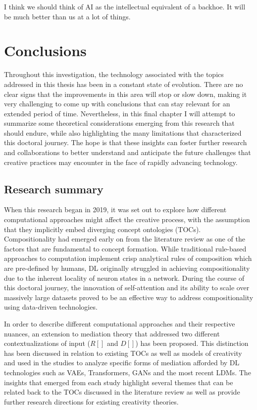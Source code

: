 \begin{savequote}[75mm]
	I think we should think of AI as the intellectual equivalent of a backhoe. It will be much better than us at a lot of things.
\end{savequote}

\chapter{Conclusions}
 Throughout this investigation, the technology associated with the topics addressed in this thesis has been in a constant state of evolution. There are no clear signs that the improvements in this area will stop or slow down, making it very challenging to come up with conclusions that can stay relevant for an extended period of time. Nevertheless, in this final chapter I will attempt to summarize some theoretical considerations emerging from this research that should endure, while also highlighting the many limitations that characterized this doctoral journey. The hope is that these insights can foster further research and collaborations to better understand and anticipate the future challenges that creative practices may encounter in the face of rapidly advancing technology.

\section{Research summary}
 When this research began in 2019, it was set out to explore how different computational approaches might affect the creative process, with the assumption that they implicitly embed diverging concept ontologies (TOCs). Compositionality had emerged early on from the literature review as one of the factors that are fundamental to concept formation. While traditional rule-based approaches to computation implement crisp analytical rules of composition which are pre-defined by humans, DL originally struggled in achieving compositionality due to the inherent locality of neuron states in a network. During the course of this doctoral journey, the innovation of self-attention and its ability to scale over massively large datasets proved to be an effective way to address compositionality using data-driven technologies.

In order to describe different computational approaches and their respective nuances, an extension to mediation theory \citep{Ihde1993} that addressed two different contextualizations of input ($R[]$ and $D[]$) has been proposed. This distinction has been discussed in relation to existing TOCs as well as models of creativity \citep{Boden1996,Boden2003,Rhodes1961,Hoorn2014} and used in the studies to analyze specific forms of mediation afforded by DL technologies such as VAEs, Transformers, GANs and the most recent LDMs. The insights that emerged from each study highlight several themes that can be related back to the TOCs discussed in the literature review as well as provide further research directions for existing creativity theories.

